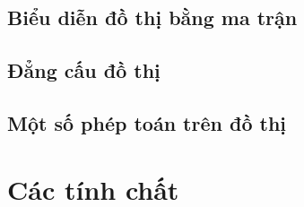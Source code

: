 \section{Biểu diễn đồ thị bằng ma trận}


\section{Đẳng cấu đồ thị}


\section{Một số phép toán trên đồ thị}
\label{sec:mot_so_phep_toan_tren_do_thi}


\chapter{Các tính chất}
\label{sec:mot_so_dinh_ly_menh_de}



\printbibliography[heading=bibintoc,title={Danh mục tài liệu tham khảo}]


